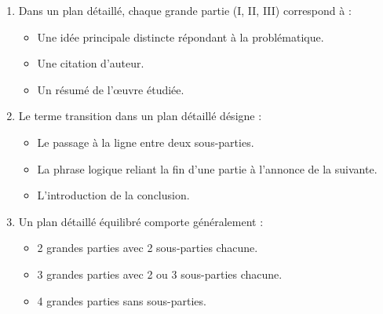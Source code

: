 \documentclass[11pt]{article}
\begin{document}
\begin{exercice}
\begin{enumerate}
    \item Dans un plan détaillé, chaque grande partie (I, II, III) correspond à :
    \begin{itemize}
        \item[A.] Une idée principale distincte répondant à la problématique.
        \item[B.] Une citation d'auteur.
        \item[C.] Un résumé de l'œuvre étudiée.
    \end{itemize}
    \item Le terme \og transition \fg{} dans un plan détaillé désigne :
    \begin{itemize}
        \item[A.] Le passage à la ligne entre deux sous-parties.
        \item[B.] La phrase logique reliant la fin d'une partie à l'annonce de la suivante.
        \item[C.] L'introduction de la conclusion.
    \end{itemize}
    \item Un plan détaillé équilibré comporte généralement :
    \begin{itemize}
        \item[A.] 2 grandes parties avec 2 sous-parties chacune.
        \item[B.] 3 grandes parties avec 2 ou 3 sous-parties chacune.
        \item[C.] 4 grandes parties sans sous-parties.
    \end{itemize}
\end{enumerate}
\end{exercice}
\end{document}
